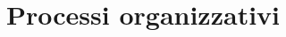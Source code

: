 \documentclass[a4paper, 11pt]{article}
\begin{document}










\pagebreak

\section{Processi organizzativi}


\end{document}
